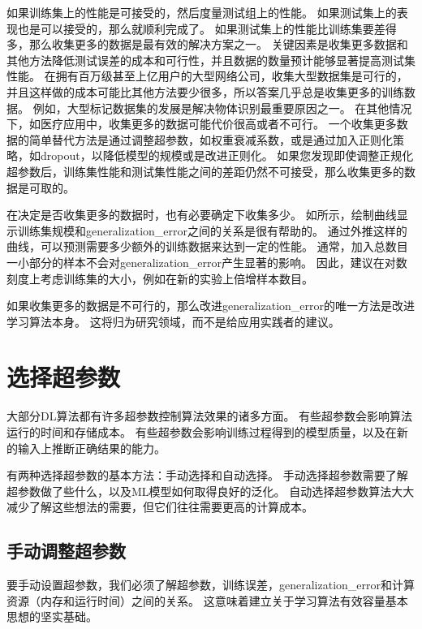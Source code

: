 
如果训练集上的性能是可接受的，然后度量测试组上的性能。
如果测试集上的表现也是可以接受的，那么就顺利完成了。
如果测试集上的性能比训练集要差得多，那么收集更多的数据是最有效的解决方案之一。
关键因素是收集更多数据和其他方法降低测试误差的成本和可行性，并且数据的数量预计能够显著提高测试集性能。
在拥有百万级甚至上亿用户的大型网络公司，收集大型数据集是可行的，并且这样做的成本可能比其他方法要少很多，所以答案几乎总是收集更多的训练数据。
例如，大型标记数据集的发展是解决物体识别最重要原因之一。
在其他情况下，如医疗应用中，收集更多的数据可能代价很高或者不可行。
一个收集更多数据的简单替代方法是通过调整超参数，如权重衰减系数，或是通过加入正则化策略，如\gls{dropout}，以降低模型的规模或是改进正则化。
如果您发现即使调整正规化超参数后，训练集性能和测试集性能之间的差距仍然不可接受，那么收集更多的数据是可取的。

在决定是否收集更多的数据时，也有必要确定下收集多少。
如所示，绘制曲线显示训练集规模和\gls{generalization_error}之间的关系是很有帮助的。
通过外推这样的曲线，可以预测需要多少额外的训练数据来达到一定的性能。
通常，加入总数目一小部分的样本不会对\gls{generalization_error}产生显著的影响。
因此，建议在对数刻度上考虑训练集的大小，例如在新的实验上倍增样本数目。

如果收集更多的数据是不可行的，那么改进\gls{generalization_error}的唯一方法是改进学习算法本身。
这将归为研究领域，而不是给应用实践者的建议。

\section{选择超参数}
\label{sec:selecting_hyperparameters}
大部分\gls{DL}算法都有许多超参数控制算法效果的诸多方面。
有些超参数会影响算法运行的时间和存储成本。
有些超参数会影响训练过程得到的模型质量，以及在新的输入上推断正确结果的能力。


有两种选择超参数的基本方法：手动选择和自动选择。
手动选择超参数需要了解超参数做了些什么，以及\gls{ML}模型如何取得良好的泛化。
自动选择超参数算法大大减少了解这些想法的需要，但它们往往需要更高的计算成本。

\subsection{手动调整超参数}
\label{sec:manual_hyperparameter_tuning}
要手动设置超参数，我们必须了解超参数，训练误差，\gls{generalization_error}和计算资源（内存和运行时间）之间的关系。
这意味着建立关于学习算法有效容量基本思想的坚实基础。

